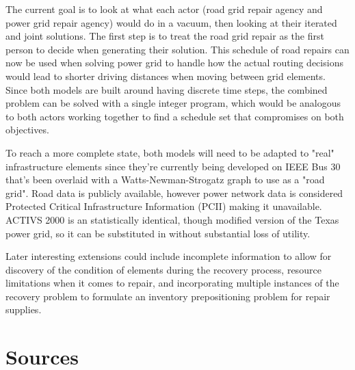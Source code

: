 \documentclass{article}
\begin{document}
	The current goal is to look at what each actor (road grid repair agency and power grid repair agency) would do in a vacuum, then looking at their iterated and joint solutions. The first step is to treat the road grid repair as the first person to decide when generating their solution. This schedule of road repairs can now be used when solving power grid to handle how the actual routing decisions would lead to shorter driving distances when moving between grid elements. Since both models are built around having discrete time steps, the combined problem can be solved with a single integer program, which would be analogous to both actors working together to find a schedule set that compromises on both objectives.
	
	To reach a more complete state, both models will need to be adapted to "real" infrastructure elements since they're currently being developed on IEEE Bus 30 that's been overlaid with a Watts-Newman-Strogatz graph to use as a "road grid". Road data is publicly available, however power network data is considered Protected Critical Infrastructure Information (PCII) making it unavailable. ACTIVS 2000 is an statistically identical, though modified version of the Texas power grid, so it can be substituted in without substantial loss of utility.
	
	Later interesting extensions could include incomplete information to allow for discovery of the condition of elements during the recovery process, resource limitations when it comes to repair, and incorporating multiple instances of the recovery problem to formulate an inventory prepositioning problem for repair supplies.
	\section{Sources}
	\printbibliography
\end{document}

